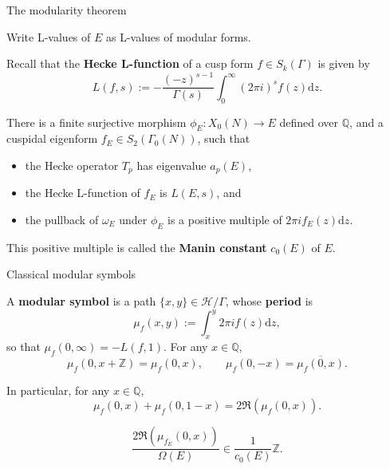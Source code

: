 \documentclass[10pt]{beamer}
\begin{document}
\begin{frame}[t]{The modularity theorem}

Write L-values of $ E $ as L-values of modular forms.

\pause

\vspace{0.5cm} Recall that the \textbf{Hecke L-function} of a cusp form $ f \in S_k(\Gamma) $ is given by
$$ L(f, s) := -\dfrac{(-z)^{s - 1}}{\Gamma(s)}\int_0^\infty (2\pi i)^sf(z)\mathrm{d}z. $$

\pause

\begin{theorem}
There is a finite surjective morphism $ \phi_E : X_0(N) \to E $ defined over $ \mathbb{Q} $, and a cuspidal eigenform $ f_E \in S_2(\Gamma_0(N)) $, such that
\begin{itemize}
\item the Hecke operator $ T_p $ has eigenvalue $ a_p(E) $,
\item the Hecke L-function of $ f_E $ is $ L(E, s) $, and
\item the pullback of $ \omega_E $ under $ \phi_E $ is a positive multiple of $ 2\pi if_E(z)\mathrm{d}z $.
\end{itemize}
\end{theorem}

\pause

This positive multiple is called the \textbf{Manin constant} $ c_0(E) $ of $ E $.

\end{frame}

\begin{frame}[t]{Classical modular symbols}

A \textbf{modular symbol} is a path $ \{x, y\} \in \mathcal{H} / \Gamma $, whose \textbf{period} is
$$ \mu_f(x, y) := \int_x^y 2\pi if(z)\mathrm{d}z, $$
so that $ \mu_f(0, \infty) = -L(f, 1) $. \pause For any $ x \in \mathbb{Q} $,
$$ \mu_f(0, x + \mathbb{Z}) = \mu_f(0, x), \qquad \mu_f(0, -x) = \overline{\mu_f(0, x)}. $$

\pause

In particular, for any $ x \in \mathbb{Q} $,
$$ \mu_f(0, x) + \mu_f(0, 1 - x) = 2\Re(\mu_f(0, x)). $$

\pause

\begin{lemma}[Manin]
$$ \dfrac{2\Re(\mu_{f_E}(0, x))}{\Omega(E)} \in \dfrac{1}{c_0(E)}\mathbb{Z}. $$
\end{lemma}

\end{frame}
\end{document}
